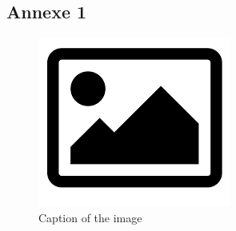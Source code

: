 \begin{appendices}

\appendixchapterformat
\appendix
\appendixpage
\addappheadtotoc

\chapter{Annexe 1}\label{annexeA}
\begin{figure}[htbp]
    \centering
    \includegraphics[width=\textwidth]{image/image.png}
    \caption{Caption of the image}
    \label{fig:image}
\end{figure}

\end{appendices}